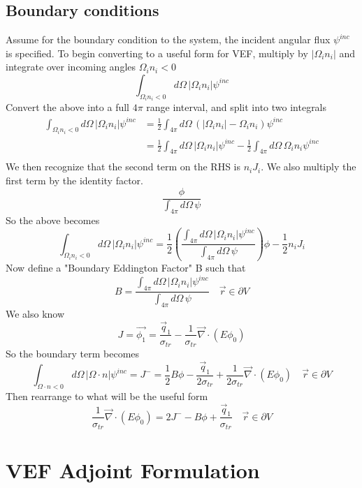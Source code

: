 \documentclass{article}
\newcommand{\vr}{\vec{r}}
\begin{document}
\subsection{Boundary conditions}
Assume for the boundary condition to the system, the incident angular flux $\psi^{inc}$ is specified. To begin converting to a useful form for VEF, multiply by $| \Omega_i n_i |$ and integrate over incoming angles $\Omega_i n_i <0$
\[
\int_{\Omega_i n_i<0} d\Omega \, \left| \Omega_i n_i \right | \psi^{inc} 
\]
Convert the above into a full $4 \pi$ range interval, and split into two integrals
\begin{align*}
\int_{\Omega_i n_i<0} d\Omega \, \left| \Omega_i n_i \right | \psi^{inc} 
&= \frac{1}{2} \int_{4 \pi} d\Omega \, \left(\left| \Omega_i n_i \right | - \Omega_i n_i  \right)\psi^{inc} \\
&= \frac{1}{2} \int_{4 \pi} d\Omega \, \left| \Omega_i n_i \right | \psi^{inc} - \frac{1}{2} \int_{4 \pi} d\Omega \,  \Omega_i n_i \psi^{inc} \\ 
\end{align*}
We then recognize that the second term on the RHS is $n_i J_i$. We also multiply the first term by the identity factor.
\[
\frac{\phi}{\int_{4\pi} d\Omega \, \psi} 
\]
So the above becomes
\[
\int_{\Omega_i n_i<0} d\Omega \, \left| \Omega_i n_i \right | \psi^{inc} = \frac{1}{2} \left( \frac{\int_{4 \pi} d\Omega \, \left| \Omega_i n_i \right | \psi^{inc}}{\int_{4\pi} d\Omega \, \psi} \right) \phi - \frac{1}{2} n_i J_i
\]
Now define a "Boundary Eddington Factor" B such that
\[
B= \frac{\int_{4 \pi} d\Omega \, \left| \Omega_i n_i \right | \psi^{inc}}{\int_{4\pi} d\Omega \, \psi} \quad \vr \in \partial V
\]
We also know
\[
J = \vec{\phi_1}=\frac{\vec{q}_1}{\sigma_{tr} } - \frac{1}{\sigma_{tr} } \vec{\nabla} \cdot \left(E \phi_0 \right)  
\]
So the boundary term becomes 
\[
\int_{\Omega \cdot n<0} d\Omega \, \left| \Omega \cdot n \right | \psi^{inc} = J^- =  \frac{1}{2} B \phi - \frac{\vec{q}_1}{2 \sigma_{tr} } + \frac{1}{2 \sigma_{tr} } \vec{\nabla} \cdot \left(E \phi_0 \right)  \quad \vr \in \partial V
\]
Then rearrange to what will be the useful form
\[
\frac{1}{\sigma_{tr} } \vec{\nabla} \cdot \left(E \phi_0 \right)  = 2J^- - B \phi + \frac{\vec{q}_1}{ \sigma_{tr} } \quad \vr \in \partial V
\]

\section{VEF Adjoint Formulation}
\end{document}
